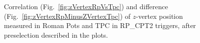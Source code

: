 \begin{figure}[ht!]
\centering
\parbox{0.4\textwidth}{
  \centering
  \begin{subfigure}[b]{\linewidth}{
                }
  \end{subfigure}
}
\quad
\parbox{0.545\textwidth}{
  \centering
  \begin{subfigure}[b]{\linewidth}{
                }
  \end{subfigure}
}%
\caption[Correlation and difference of $z$-vertex position measured in Roman Pots and TPC.]{Correlation (Fig.~\ref{fig:zVertexRpVsTpc}) and difference (Fig.~\ref{fig:zVertexRpMinusZVertexTpc}) of $z$-vertex position measured in Roman Pots and TPC in RP\_CPT2 triggers, after preselection described in the plots.}\label{fig:zVertexRpTpc}
\end{figure}%
